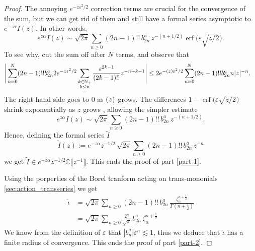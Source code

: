\documentclass{article}
\let\Re\relax
\DeclareMathOperator{\Re}{Re}
\newcommand{\C}{\mathbb{C}}
\theoremstyle{definition}
\theoremstyle{plain}
\begin{document}
\begin{proof}
The annoying $e^{-z\varepsilon^2/2}$ correction terms are crucial for the convergence of the sum, but we can get rid of them and still have a formal series asymptotic to $e^{-z \alpha} I(z)$. In other words,
\[ e^{z \alpha} I(z) \sim \sqrt{2\pi} \sum_{n \ge 0} (2n-1)!!\,b_{2n}^a\,z^{-(n+1/2)} \operatorname{erf}\big(\varepsilon \sqrt{z/2}\big). \]
To see why, cut the sum off after $N$ terms, and observe that
\begin{align*}
  \Bigg | \sum_{n= 0}^N(2n-1)!! b_{2n}^a  2e^{-z\varepsilon^2/2} \sum_{\substack{k \in \mathbb{N}_+ \\ k \le n}} \frac{\varepsilon^{2k-1}}{(2k-1)!!} z^{-n+k-1} \Bigg | &\leq  2 e^{-\Re (z) \varepsilon^2/2} \sum_{n=0}^N(2n-1)!! b_{2n}^a n|z|^{-n}.
\end{align*}
The right-hand side goes to $0$ as $\Re(z)$ grows.
The differences $1 - \operatorname{erf}\big(\varepsilon \sqrt{z/2}\big)$ shrink exponentially as $z$ grows \cite[inequality~(5)]{chiani-dardari-book}, allowing the simpler estimate
\[ e^{z\alpha} I(z) \sim \sqrt{2\pi} \sum_{n \ge 0} (2n-1)!!\, b_{2n}^a \,z^{-(n+1/2)}. \]
Hence, defining the formal series $\tilde{I}$
\[\tilde{I}(z):=e^{-z\alpha} z^{-1/2}\, \sqrt{2\pi} \sum_{n \ge 0} (2n-1)!!\, b_{2n}^a \,z^{-n}\]
we get $\tilde{I}\in e^{-z\alpha}z^{-1/2}\C\llbracket z^{-1}\rrbracket$. This ends the proof of part \ref{part-1}.

Using the porperties of the Borel tranform acting on trans-mononials \ref{sec:action_transseries} we get 
\begin{align*}
\tilde{\iota} & = \sqrt{2\pi} \sum_{n \ge 0} (2n - 1)!! \,b_{2n}^a\,\frac{\zeta_\alpha^{n+\tfrac{1}{2}}}{\Gamma(n+\tfrac{1}{2})} \\
&= \sqrt{2\pi} \sum_{n \ge 0} \frac{2^n}{\sqrt{\pi}} \,b_{2n}^a\,\zeta_\alpha^{n+\tfrac{1}{2}}
\end{align*}
We know from the definition of $\varepsilon$ that $\left|b_n^a\right| \varepsilon^n \lesssim 1$, thus we deduce that $\tilde{\iota}$ has a finite radius of convergence. This ends the proof of part \ref{part-2}. %


\end{proof}
\end{document}
